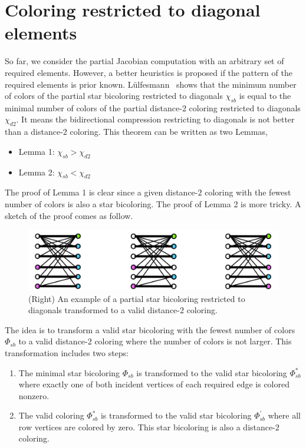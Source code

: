 \documentclass[12pt, twoside,a4paper,toc=bibliography]{scrbook}
\begin{document}
\section{Coloring restricted to diagonal elements}
\label{s.part.color.diag}
So far, we consider the partial Jacobian computation with an arbitrary
set of required elements. However, a better heuristics is proposed if the
pattern of the required elements is prior known.
Lülfesmann~\cite{Lulfesmann2012Fap} shows that the minimum number of colors of
the partial star bicoloring restricted to diagonals $\chi_{sb}$ is equal to
the minimal number of colors of the partial distance-$2$ coloring restricted
to diagonals $\chi_{d2}$. It means the bidirectional compression restricting to diagonals is not better than
a distance-$2$ coloring. 
This theorem can be written as two Lemmas,
\begin{itemize}
\item Lemma 1: $\chi_{sb} > \chi_{d2}$
\item Lemma 2: $\chi_{sb} < \chi_{d2}$
\end{itemize}
The proof of Lemma 1 is clear since
a given distance-$2$ coloring with the fewest number of colors is also a star bicoloring.
The proof of Lemma 2 is more tricky. A sketch of the proof comes as follow.
\begin{figure}
\includegraphics[width=\linewidth]{proof1.png}
\caption{
(Right) An example of a partial star bicoloring restricted to diagonals
transformed to a valid distance-$2$ coloring.}
\label{proof1}
\end{figure}


The idea is to transform a valid star bicoloring with the fewest number of colors $\Phi_{sb}$ to 
a valid distance-$2$ coloring where the number of colors is not larger.
This transformation includes two steps:
\begin{enumerate}
\item The minimal star bicoloring $\Phi_{sb}$ is transformed 
to the valid star bicoloring $\Phi_{sb}^{*}$ 
where exactly one of both incident vertices of each required edge is colored nonzero.
\item The valid coloring $\Phi_{sb}^{*}$ is transformed 
to the valid star bicoloring $\Phi_{sb}^{'}$ where all row vertices are colored by zero.
This star bicoloring is also a distance-$2$ coloring.
\end{enumerate}
\end{document}
